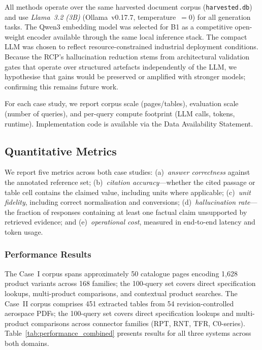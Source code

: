 \documentclass[largeformat]{interact}
\begin{document}
All methods operate over the same harvested document corpus (\texttt{harvested.db}) and use \emph{Llama~3.2 (3B)} (Ollama~v0.17.7, temperature~$= 0$) for all generation tasks. The Qwen3 embedding model was selected for B1 as a competitive open-weight encoder available through the same local inference stack. The compact LLM was chosen to reflect resource-constrained industrial deployment conditions. Because the RCP's hallucination reduction stems from architectural validation gates that operate over structured artefacts independently of the LLM, we hypothesise that gains would be preserved or amplified with stronger models; confirming this remains future work.

For each case study, we report corpus scale (pages/tables), evaluation scale (number of queries), and per-query compute footprint (LLM calls, tokens, runtime). Implementation code is available via the Data Availability Statement.

\subsection{Quantitative Metrics}
\label{subsec:quantitative_metrics}
We report five metrics across both case studies:
(a)~\textit{answer correctness} against the annotated reference set;
(b)~\textit{citation accuracy}---whether the cited passage or table cell contains the claimed value, including units where applicable;
(c)~\textit{unit fidelity}, including correct normalisation and conversions;
(d)~\textit{hallucination rate}---the fraction of responses containing at least one factual claim unsupported by retrieved evidence; and
(e)~\textit{operational cost}, measured in end-to-end latency and token usage.

\subsubsection{Performance Results}
\label{subsubsec:performance_results}
The Case~I corpus spans approximately 50 catalogue pages encoding 1{,}628 product variants across 168 families; the 100-query set covers direct specification lookups, multi-product comparisons, and contextual product searches. The Case~II corpus comprises 451 extracted tables from 54 revision-controlled aerospace PDFs; the 100-query set covers direct specification lookups and multi-product comparisons across connector families (RPT, RNT, TFR, C0-series). Table~\ref{tab:performance_combined} presents results for all three systems across both domains.
\end{document}
